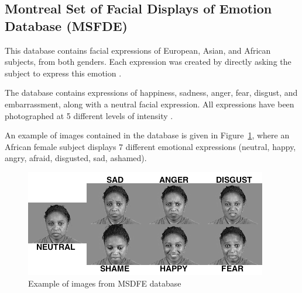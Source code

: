 \subsection{Montreal Set of Facial Displays of Emotion Database (MSFDE)}

\vspace{\baselineskip}
\noindent This database contains facial expressions of European, Asian, and African subjects, from both genders. Each expression was created by directly asking the subject to express this emotion \cite{MSFDE}.
\newline

\noindent The database contains expressions of happiness, sadness, anger, fear, disgust, and embarrassment, along with a neutral facial expression. All expressions have been photographed at 5 different levels of intensity \cite{MSFDE}.
\newline

\noindent An example of images contained in the database is given in Figure~\ref{msfde_7facialexpressions}, where an African female subject displays 7 different emotional expressions (neutral, happy, angry, afraid, disgusted, sad, ashamed).
\newline

\begin{figure}[!h]
\begin{center}
\noindent \includegraphics[scale=0.8]{figures/msfde_7facialexpressions} 
\newline
\caption{Example of images from MSDFE database}
\label{msfde_7facialexpressions}
\end{center} 
\end{figure}






